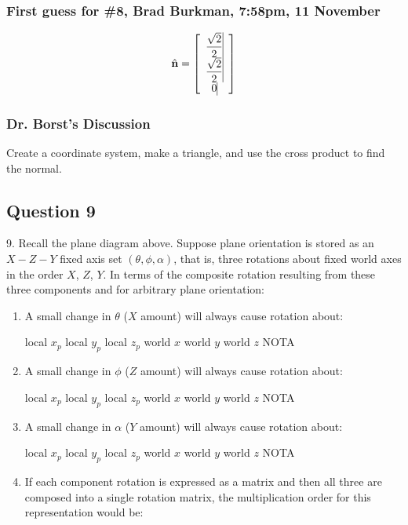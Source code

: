 \documentclass[11pt]{article}
\begin{document}
\begin{spacing}{1.2}
\subsubsection{First guess for \#8, Brad Burkman, 7:58pm, 11 November}
$$\hat{\mathbf{n}} = 
\left[
\begin{array}{>{\displaystyle}c<{\vrule width 0pt height 24pt depth 8pt}}
	 \frac{\sqrt2}{2}\cr
	 \frac{\sqrt2}{2}\cr
	 0 
\end{array}
\right]
$$

\subsubsection{Dr. Borst's Discussion}

Create a coordinate system, make a triangle, and use the cross product to find the normal.  

\subsection{Question 9}
9.  Recall the plane diagram above.  Suppose plane orientation is stored as an $X-Z-Y$ fixed axis set $(\theta, \phi, \alpha)$, that is, three rotations about fixed world axes in the order $X$, $Z$, $Y$.  In terms of the composite rotation resulting from these three components and for arbitrary plane orientation:

\begin{enumerate}[label=\arabic*)]
	\item A small change in $\theta$ ($X$ amount) will always cause rotation about:
	
	local $x_p$ \qquad local $y_p$ \qquad local $z_p$ \qquad world $x$ \qquad world $y$ \qquad world $z$ \qquad NOTA
	\item A small change in $\phi$ ($Z$ amount) will always cause rotation about:
	
	local $x_p$ \qquad local $y_p$ \qquad local $z_p$ \qquad world $x$ \qquad world $y$ \qquad world $z$ \qquad NOTA
	
	\item A small change in $\alpha$ ($Y$ amount) will always cause rotation about:
	
	local $x_p$ \qquad local $y_p$ \qquad local $z_p$ \qquad world $x$ \qquad world $y$ \qquad world $z$ \qquad NOTA
	\item If each component rotation is expressed as a matrix and then all three are composed into a single rotation matrix, the multiplication order for this representation would be:
	

\end{enumerate}
\end{spacing}
\end{document}
